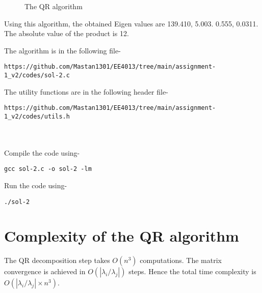 \documentclass[journal,12pt,twocolumn]{IEEEtran}
\begin{document}
\begin{figure}[h!]
	\begin{center}
		\resizebox{\columnwidth/1}{!}{}
	\end{center}
	\caption{The QR algorithm}
	\label{fig:fig4}
\end{figure}

Using this algorithm, the obtained Eigen values are 139.410, 5.003. 0.555, 0.0311. The absolute value of the product is 12. 

The algorithm is in the following file- 
\begin{lstlisting}
https://github.com/Mastan1301/EE4013/tree/main/assignment-1_v2/codes/sol-2.c
\end{lstlisting}
The utility functions are in the following header file- 
\begin{lstlisting}
https://github.com/Mastan1301/EE4013/tree/main/assignment-1_v2/codes/utils.h
\end{lstlisting}
\\ ~ \\
Compile the code using-
\begin{lstlisting}
gcc sol-2.c -o sol-2 -lm
\end{lstlisting}
Run the code using-
\begin{lstlisting}
./sol-2
\end{lstlisting}

\section{Complexity of the QR algorithm}
The QR decomposition step takes $O(n ^ 3)$ computations. The matrix convergence is achieved in $O(|\lambda_i / \lambda_j|)$ steps. Hence the total time complexity is $O(|\lambda_i / \lambda_j| \times n ^ 3)$.
\end{document}

